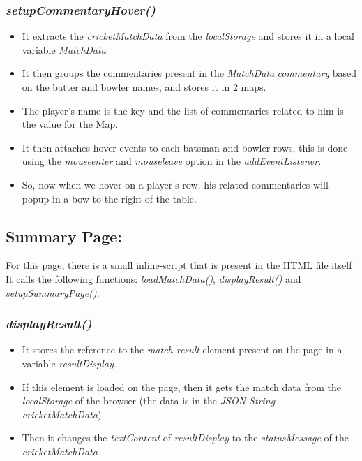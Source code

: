 \documentclass[a4paper,12pt]{article}
\begin{document}
\subsubsection{\textit{setupCommentaryHover()}}
\label{commentaryHover}
\begin{itemize}
\item It extracts the \textit{cricketMatchData} from the \textit{localStorage} and stores it in a local variable \textit{MatchData}
\item It then groups the commentaries present in the \textit{MatchData.commentary} based on the batter and bowler names, and stores it in 2 maps.
\item The player's name is the key and the list of commentaries related to him is the value for the Map.
\item It then attaches hover events to each batsman and bowler rows, this is done using the \textit{mouseenter} and \textit{mouseleave} option in the \textit{addEventListener}.
\item So, now when we hover on a player's row, his related commentaries will popup in a bow to the right of the table.
\end{itemize}

\subsection{Summary Page:}
\label{basic4}
For this page, there is a small inline-script that is present in the HTML file itself \\
It calls the following functions: \textit{loadMatchData()}, \textit{displayResult()} and \\ \textit{setupSummaryPage()}.
\subsubsection{\textit{displayResult()}}
\begin{itemize}
\item It stores the reference to the \textit{match-result} element present on the page in a variable \textit{resultDisplay}.
\item If this element is loaded on the page, then it gets the match data from the \\ \textit{localStorage} of the browser (the data is in the \textit{JSON String cricketMatchData})
\item Then it changes the \textit{textContent} of \textit{resultDisplay} to the \textit{statusMessage} of the \\ \textit{cricketMatchData}
\end{itemize}
\end{document}
